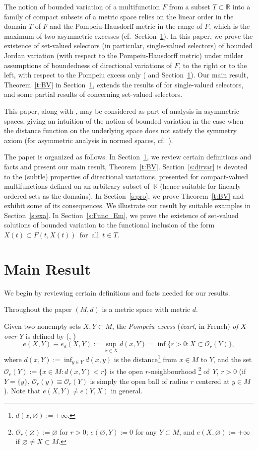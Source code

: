 \documentclass[preprint,12pt]{elsarticle}
\newcommand{\Rb}{\mathbb{R}}  \newcommand{\Nb}{\mathbb{N}}
\newcommand{\Oc}{\mathcal{O}}
\newcommand{\es}{\varnothing}
\begin{document}
The notion of bounded variation of a multifunction $F$ from a subset $T\subset\Rb$
into a family of compact subsets of a metric space relies on the linear order in 
the domain $T$ of $F$ and the Pompeiu-Hausdorff metric in the range of $F$,
which is the maximum of two asymmetric excesses (cf.~Section~\ref{s:mr}).
In this paper, we prove the existence of set-valued selectors (in particular,
single-valued selectors) of bounded Jordan variation (with respect to the
Pompeiu-Hausdorff metric) under milder assumptions of boundedness of directional
variations of $F$, to the right or to the left, with respect to the Pompeiu excess only
(\cite{JMAA07} and Section~\ref{s:mr}). Our main result, Theorem~\ref{t:BV} in
Section~\ref{s:mr}, extends the results of \cite{JMAA07} for single-valued
selectors, and some partial results of \cite{Tretya} concerning set-valued selectors.

This paper, along with \cite{JMAA07}, may be considered as part of analysis in 
asymmetric spaces, giving an intuition of the notion of bounded variation in 
the case when the distance function on the underlying space does not satisfy the 
symmetry axiom (for asymmetric analysis in normed spaces, cf.~\cite{Cobzas}).

The paper is organized as follows. In Section~\ref{s:mr}, we review certain definitions
and facts and present our main result, Theorem~\ref{t:BV}. Section~\ref{s:dirvar}
is devoted to the (subtle) properties of directional variations, presented for
compact-valued multifunctions defined on an arbitrary subset of~$\Rb$ (hence
suitable for linearly ordered sets as the domains). In Section~\ref{s:pro}, we prove 
Theorem~\ref{t:BV} and exhibit some of its consequences. We illustrate our result
by suitable examples in Section~\ref{s:exa}. In Section~\ref{s:Func_Em}, we prove
the existence of set-valued solutions of bounded variation to the functional inclusion
of the form $X(t)\!\subset\! F(t,X(t))$~for~all~$t\!\in\! T$.

\section{Main Result} \label{s:mr}

We begin by reviewing certain definitions and facts needed for our results.

Throughout the paper $(M,d)$ is a metric space with metric $d$.

Given two nonempty sets $X,Y\subset M$,
the \emph{Pompeiu excess\/} ({\it {\'e}cart}, in French) {\it of $X$ over $Y$}
 is defined by (\cite[pp.~281--282]{Pomp}, \cite[Chapter~II]{CV})
  \begin{equation*}
e(X,Y)\equiv e_d(X,Y):=\sup_{x\in X}d(x,Y)=\inf\{r>0:X\subset\Oc_r(Y)\},
  \end{equation*}
where $d(x,Y):=\inf_{y\in Y}d(x,y)$ is the distance\footnote{$d(x,\es):=+\infty.$}
from $x\in M$ to $Y$,
and the set $\Oc_r(Y):=\{x\in M:d(x,Y)<r\}$ is the open $r$-neighbourhood%
\footnote{$\Oc_r(\es)\!:=\!\es$ for $r>0$; $e(\es,Y):=0$ for any $Y\subset M$,
and $e(X,\es):=+\infty$ if $\es\!\ne\! X\!\subset\! M$.}
of~$Y$, $r>0$ (if $Y=\{y\}$,
$\Oc_r(y)\equiv\Oc_r(Y)$ is simply the open ball of radius $r$ centered at $y\in M$).
Note that $e(X,Y)\ne e(Y,X)$ in general.
\end{document}
